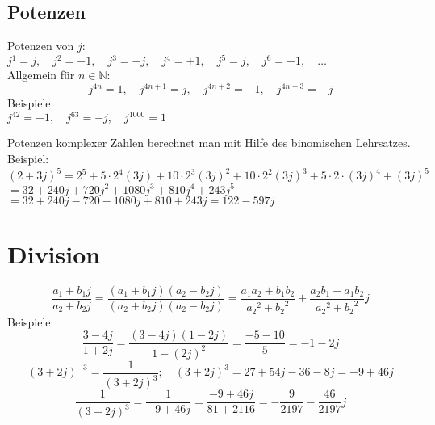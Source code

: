\subsection{Potenzen}
Potenzen von $j$: \\
$j^1 = j, \quad j^2 = -1, \quad j^3 = -j, \quad j^4 = +1, \quad j^5 = j, \quad j^6 = -1, \quad \dots$\\
Allgemein für $n \in \mathbb{N}$: 
\[ \boxed{j^{4n} = 1, \quad j^{4n+1} = j, \quad j^{4n+2} = -1, \quad j^{4n+3} = -j} \]
Beispiele: \\
$j^{42} = -1, \quad j^{63} = -j, \quad j^{1000} = 1$

Potenzen komplexer Zahlen berechnet man mit Hilfe des binomischen Lehrsatzes. \\
Beispiel: \\
$(2 + 3 j)^5 = 2^5 + 5 \cdot 2^4 (3 j) + 10 \cdot 2^3 (3 j)^2 + 10 \cdot 2^2 (3 j)^3 + 5 \cdot 2 \cdot (3 j)^4 + (3 j)^5$\\
$ = 32 + 240 j + 720 j^2 + 1080 j^3 + 810 j^4 + 243 j^5$\\
$= 32 + 240 j - 720 - 1080 j + 810 + 243 j = 122 - 597 j$

\section{Division}
\[ \boxed{\frac{a_1 + b_1 j}{a_2 + b_2 j} = \frac{(a_1 + b_1 j)(a_2 - b_2 j)}{(a_2 + b_2 j)(a_2 - b_2 j)} = \frac{a_1 a_2 + b_1 b_2}{{a_2}^2 + {b_2}^2} + \frac{a_2 b_1 - a_1 b_2}{{a_2}^2 + {b_2}^2} j} \]
Beispiele: \\
\[ \frac{3 - 4 j}{1 + 2 j} = \frac{(3 - 4 j)(1 - 2 j)}{1 - (2 j)^2} = \frac{-5 -10}{5} = -1 -2 j \]
\[ (3 + 2 j)^{-3} = \frac{1}{(3 + 2 j)^3}; \quad (3 + 2 j)^3 = 27 + 54 j - 36 - 8 j = -9 + 46 j \]
\[ \frac{1}{(3 + 2 j)^3} = \frac{1}{-9 + 46 j} = \frac{-9 + 46 j}{81 + 2116} = -\frac{9}{2197} - \frac{46}{2197} j \]
